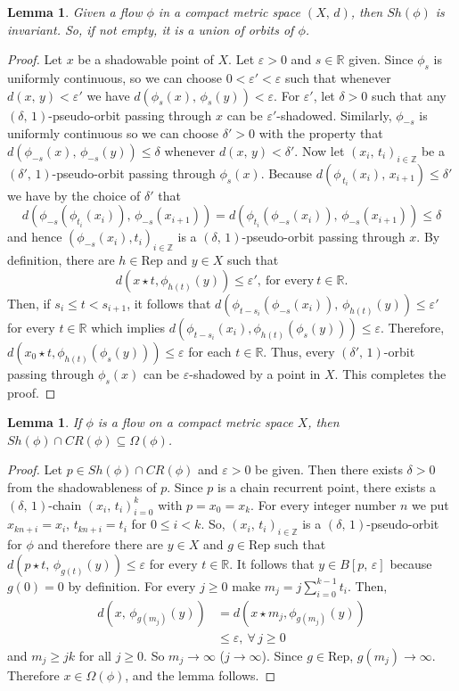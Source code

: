 \documentclass{amsart}
\newtheorem{lemma}[theorem]{Lemma}
\theoremstyle{definition}
\newcommand{\ep}{\varepsilon}
\begin{document}
 
\begin{lemma}\label{lemma1}
Given  a flow $\phi$ in a compact metric space $(X,\, d)$, then  $Sh(\phi)$ is invariant. So, if not empty, it is a union of orbits of $\phi$.
\end{lemma}
\begin{proof}
Let $x$ be a shadowable point of $X$. Let $\ep > 0$ and $s\in\mathbb{R}$ given. Since $\phi_s$ is uniformly continuous, so we can choose $0 <\ep' < \ep$ such that whenever $d(x,\,y) < \ep'$ we have $d(\phi_s(x),\,\phi_s(y))<\ep$. For $\ep'$, let  $\delta>0$ such that any  $(\delta,\, 1)$-pseudo-orbit passing through $x$ can be $\ep'$-shadowed. Similarly, $\phi_{-s}$ is uniformly continuous so we can choose $\delta' > 0$ with the property that $d(\phi_{-s}(x),\, \phi_{-s}(y))\leq \delta$ whenever $d(x,\, y) < \delta'$. Now let $(x_i,\, t_i)_{i\in \mathbb{Z}}$ be a $(\delta',\, 1)$-pseudo-orbit passing through $\phi_s(x)$. Because $d(\phi_{\,t_i}(x_i),\, x_{i+1}) \leq \delta'$ we have by the choice of $\delta'$ that \[d(\phi_{-s}(\phi_{t_i}(x_i)),\, \phi_{-s}(x_{i+1})) = d(\phi_{t_i}(\phi_{-s}(x_i)),\, \phi_{-s}(x_{i+1})) \leq \delta\] and hence $(\phi_{-s}(x_i), t_i)_{i\in \mathbb{Z}}$ is a $(\delta,\, 1)$-pseudo-orbit passing through $x$. By definition, there are $h\in \mathrm{Rep}$ and $y\in X$ such that
\[d(x\star t, \phi_{h(t)}(y)) \leq \ep',\ \mbox{for every}\ t\in\mathbb{R}.\]
Then, if $s_i\leq t< s_{i+1}$, it follows that $d(\phi_{t-s_i}(\phi_{-s}(x_i)),\,\phi_{h(t)}(y))\leq\ep'$ for every $t\in\mathbb{R}$ which implies $d(\phi_{t-s_i}(x_i), \phi_{h(t)}(\phi_s(y)))\leq \ep$. Therefore, $d(x_0\star t, \phi_{h(t)}(\phi_s(y)))\leq \ep$ for each $t\in \mathbb{R}$. Thus, every $(\delta',\,1)$-orbit passing through $\phi_s(x)$ can be $\ep$-shadowed by a point in $X$. This completes the proof.
\end{proof}
 

\begin{lemma}\label{lemma4}
If $\phi$ is a flow on a compact metric space $X$, then $Sh(\phi)\cap CR(\phi) \subseteq \Omega(\phi)$.
\end{lemma}
\begin{proof}
Let $p\in Sh(\phi)\cap CR(\phi)$  and $\ep > 0$ be given. Then there exists $\delta > 0$ from the shadowableness of $p$. Since $p$ is a chain recurrent point, there exists a $(\delta,\,1)$-chain $(x_i,\, t_i)_{i = 0}^k$ with $p = x_0 = x_k$. For every integer number $n$ we put $x_{kn+i} = x_i$, $t_{kn +i} = t_i$ for $0\leq i < k$.  So, $(x_i,\, t_i)_{i\in\mathbb{Z}}$ is a $(\delta,\,1)$-pseudo-orbit for $\phi$ and therefore there are $y\in X$ and $g\in\mathrm{Rep}$  such that $d(p\star t,\,\phi_{g(t)}(y))\leq\ep$ for every $t\in \mathbb{R}$. It follows that $y\in B[p,\,\ep]$ because $g(0) = 0$ by definition. For every $j \geq 0$ make $m_j = j\sum_{i=0}^{k-1}t_i$. Then,
\begin{align*}
d(x,\,\phi_{g(m_j)}(y)) &= d(x\star m_j, \phi_{g(m_j)}(y))\\
						&\leq\ep,\ \forall\,j\geq0
\end{align*}
and  $m_j\geq jk$ for all $j\geq 0$. So $m_j\to\infty$ ($j\to\infty$). Since $g\in\mathrm{Rep}$, $g(m_j)\to\infty$. Therefore $x\in\Omega(\phi)$, and the lemma follows.
\end{proof}
\end{document}
